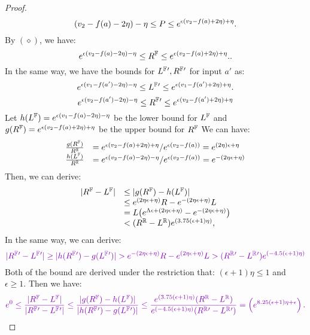 \documentclass[a4paper,11pt]{article}
\begin{document}
\begin{proof}
{$${		 (v_2 - f(a) - 2\eta) - \eta}
		\leq P \leq
		e^{\epsilon 
		(v_2 - f(a) + 2\eta) + \eta}.
$$
		By $(\diamond)$, we have:
		$$
		e^{\epsilon 
		 (v_2 - f(a) - 2\eta) - \eta}
		\leq R^{\mathbb{F}} \leq
		e^{\epsilon 
		(v_2 - f(a) + 2\eta) + \eta}.
		.$$	
%
		In the same way, we have the bounds for $L^{\mathbb{F}}{'}, R^{\mathbb{F}}{'}$ for input $a'$ as:
%
		$$e^{\epsilon 
		 (v_1 - f(a') - 2\eta) - \eta}
		\leq L^{\mathbb{F}}{'} \leq
		e^{\epsilon 
		(v_1 - f(a') + 2\eta) + \eta}.$$
		$$ 
		e^{\epsilon 
		 (v_2 - f(a') - 2\eta) - \eta}
		\leq R^{\mathbb{F}}{'} \leq
		e^{\epsilon 
		(v_2 - f(a') + 2\eta) + \eta}$$
%
		Let  
		$h{(L^{\mathbb{F}}) } = e^{\epsilon 
		 (v_1 - f(a) - 2\eta) - \eta}$ 
		 be the lower bound for $L^{\mathbb{F}}$
		and $g(R^{\mathbb{F}}) = e^{\epsilon 
		(v_2 - f(a) + 2\eta) + \eta}$ 
		be the upper bound for $R^{\mathbb{F}}$
		We can have:
		\[
		\begin{array}{ll}
		\frac{g(\fvalR)}{\rvarR} 
		& = e^{\epsilon 
		(\valv_2 - f(a) + 2\eta) + \eta}/e^{\epsilon(\valv_2 - f(a))}
		 =
		e^{ 
		(2\eta)\epsilon + \eta}
		\\
%
		\frac{h(\fvalL )}{\rvarR} 
		& = e^{\epsilon 
		(\valv_2 - f(a) - 2\eta) - \eta}/e^{\epsilon(\valv_2 - f(a))}
		 =
		e^{ 
		-(2\eta\epsilon + \eta)}
		\end{array}
		\]
		Then, we can derive:
		\[
		\begin{array}{ll}
		|R^{\mathbb{F}} - L^{\mathbb{F}}|
		& \leq |g(R^{\mathbb{F}} ) - h(L^{\mathbb{F}} )| \\
		& \leq e^{ 
		(2\eta \epsilon + \eta)}R - 
		e^{-(2\eta\epsilon + \eta)} L \\
		& = L \big(  e^{ \Lambda\epsilon + (2\eta \epsilon + \eta)} 
		- e^{-(2\eta \epsilon + \eta)} \big)\\
		& < (R^{\mathbb{R}} - L^{\mathbb{R}})
		e^{(3.75(\epsilon + 1) \eta )},
		\end{array}
		\]
		In the same way, we can derive:
		\[
		\extend{
		|\fvarR{'} - \fvalL{'}|
		\geq 
		|h(\fvalR{'} ) - g(\fvalL{'} )|
		 > e^{-(2\eta \epsilon + \eta)} R 
		 - e^{(2\eta \epsilon + \eta)} L
		> (\rvalR{'} - \rvalL{'})
		e^{(-4.5(\epsilon + 1) \eta)}
		}
		\]
		Both of the bound are derived under the restriction that: $(\epsilon + 1) \eta \leq 1$ and $\epsilon \geq 1$.
		Then we have:
		\[
		\extend{
		e^0 \leq 
		\frac{|\fvalR - \fvalL |}
		{|\fvalR{'} - \fvalL{'}|}
		\leq
		\frac{|g(\fvalR ) - h(\fvalL )|}
		{|h(\fvalR{'} ) - g(\fvalL{'} )|}
		\leq 
		\frac{e^{(3.75(\epsilon + 1) \eta )}(\rvalR - \rvalL) }
		{e^{(-4.5(\epsilon + 1) \eta)} (\rvalR{'} - \rvalL{'})}
		=
		\left(
		e^{8.25( \epsilon + 1) \eta + \epsilon}
		\right).
		}		
		\]
		}
%
\end{proof}




\newpage


\end{document}
